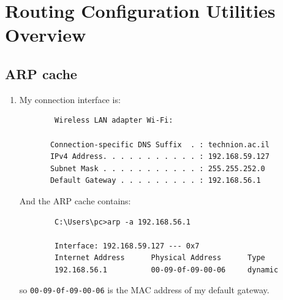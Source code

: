 \section{Routing Configuration Utilities Overview}
\subsection{ARP cache}
\begin{enumerate}[label=\alph*.]
	\item
	My connection interface is:
	\begin{verbatim}
		Wireless LAN adapter Wi-Fi:
	
	   Connection-specific DNS Suffix  . : technion.ac.il
	   IPv4 Address. . . . . . . . . . . : 192.168.59.127
	   Subnet Mask . . . . . . . . . . . : 255.255.252.0
	   Default Gateway . . . . . . . . . : 192.168.56.1
	\end{verbatim}
	
	And the ARP cache contains:
	\begin{verbatim}
		C:\Users\pc>arp -a 192.168.56.1
	
		Interface: 192.168.59.127 --- 0x7
		Internet Address      Physical Address      Type
		192.168.56.1          00-09-0f-09-00-06     dynamic
	\end{verbatim}
	so \texttt{00-09-0f-09-00-06} is the MAC address of my default gateway.
	

\end{enumerate}
